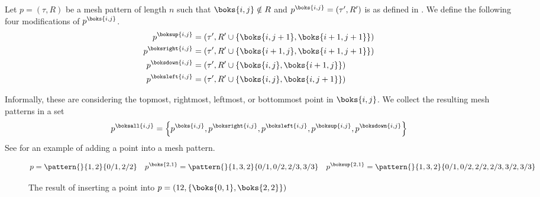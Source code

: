 \begin{definition}
Let \(p=(\tau,R)\) be a mesh pattern of length \(n\) such that \(\boks{i,j}\notin R\) and
\(p^\boks{i,j} = (\tau^\prime,R^\prime)\) is as defined in . We define
the following four modifications of \(p^\boks{i,j}\).
\begin{align*}
p^\boksup{i,j} &= (\tau^\prime, R^\prime \cup \{\boks{i,j+1},\boks{i+1,j+1}\})\\
p^\boksright{i,j} &= (\tau^\prime, R^\prime \cup \{\boks{i+1,j},\boks{i+1,j+1}\})\\
p^\boksdown{i,j} &= (\tau^\prime, R^\prime \cup \{\boks{i,j},\boks{i+1,j}\})\\
p^\boksleft{i,j} &= (\tau^\prime, R^\prime \cup \{\boks{i,j},\boks{i,j+1}\})\\
\end{align*}
\end{definition}
Informally, these are considering the topmost, rightmost, leftmost, or bottommost point in
\(\boks{i,j}\). We collect the resulting mesh patterns in a set
\begin{equation*}
p^\boksall{i,j}=\left\{
p^\boks{i,j},
p^\boksright{i,j},
p^\boksleft{i,j},
p^\boksup{i,j},
p^\boksdown{i,j}\right\}
\end{equation*}
See  for an example of adding a point into a mesh pattern.

\begin{figure}
\begin{equation*}
p = \pattern{}{1,2}{0/1,2/2} \quad
p^\boks{2,1}= \pattern{}{1,3,2}{0/1,0/2,2/3,3/3}
\quad
p^\boksup{2,1}
= \pattern{}{1,3,2}{0/1,0/2,2/2,2/3,3/2,3/3}
\end{equation*}
\caption{The result of inserting a point into \(p=(12,\{\boks{0,1},\boks{2,2}\})\)}
\label{fig:addp}
\end{figure}

